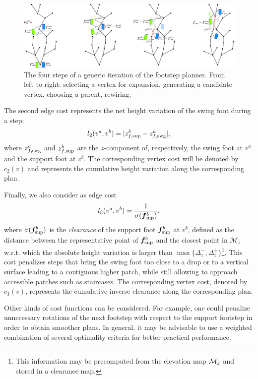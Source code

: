 \begin{figure}
\centering
\includegraphics[width=\textwidth]{figures/FootstepPlanner.pdf}
\caption{The four steps of a generic iteration of the footstep planner. From left to right: selecting a vertex for expansion, generating a candidate vertex, choosing a parent, rewiring.}
\label{fig:WoS:FootstepPlanner}
\end{figure}   
    
The second edge cost represents the net height variation of the swing foot during a step:
\begin{equation}
l_2(v^a, v^b) = |z^b_{f, {\rm sup}} - z^a_{f, {\rm swg}}|,
\label{eq:WoS:costHeight}
\end{equation}
where $z^a_{f, {\rm swg}}$ and $z^b_{f, {\rm sup}}$ are the $z$-component of, respectively, the swing foot at $v^a$ and the support foot at $v^b$.  The corresponding vertex cost will be denoted by $c_2(v)$ and represents the cumulative height variation along the corresponding plan. 
    
Finally, we  also consider as edge cost
\begin{equation}
l_3(v^a, v^b) = \frac{1}{\sigma ({\bm{f}}^b_{\rm sup})},
\label{eq:WoS:costClearance}
\end{equation}
where $\sigma ({\bm{f}}^b_{\rm sup})$ is the {\em clearance} of the support foot ${\bm{f}}^b_{\rm sup}$ at $v^b$, defined as the distance between the representative point of ${\bm{f}}^b_{\rm sup}$ and the closest point in $\mathcal{M}_z$
w.r.t. which the absolute height variation is larger than $\max\{\Delta_z^-, \Delta_z^+\}$\footnote{This information may be precomputed from the elevation map ${\cal M}_z$ and stored in a clearance map.}.
This cost penalizes steps that bring the swing foot too close to a drop or to a vertical surface leading to a contiguous higher patch,
while still allowing to approach accessible patches such as staircases.
The corresponding vertex cost, denoted by $c_3(v)$, represents the cumulative inverse clearance along the corresponding plan.

Other kinds of cost functions can be considered. For example, one could penalize unnecessary rotations of the next footstep with respect to the support footstep in order to obtain smoother plans.  
In general, it may be advisable to use a weighted combination of several optimality criteria for better practical performance. 

